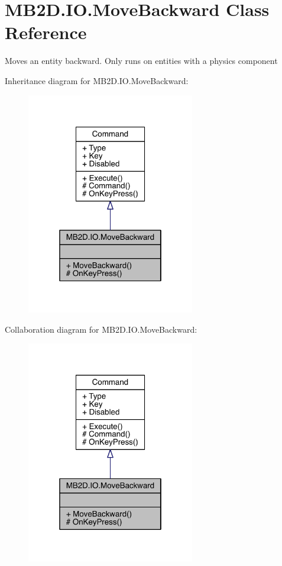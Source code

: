 \hypertarget{class_m_b2_d_1_1_i_o_1_1_move_backward}{}\section{M\+B2\+D.\+I\+O.\+Move\+Backward Class Reference}
\label{class_m_b2_d_1_1_i_o_1_1_move_backward}


Moves an entity backward. Only runs on entities with a physics component  




Inheritance diagram for M\+B2\+D.\+I\+O.\+Move\+Backward\+:
\nopagebreak
\begin{figure}[H]
\begin{center}
\leavevmode
\includegraphics[width=208pt]{class_m_b2_d_1_1_i_o_1_1_move_backward__inherit__graph}
\end{center}
\end{figure}


Collaboration diagram for M\+B2\+D.\+I\+O.\+Move\+Backward\+:
\nopagebreak
\begin{figure}[H]
\begin{center}
\leavevmode
\includegraphics[width=208pt]{class_m_b2_d_1_1_i_o_1_1_move_backward__coll__graph}
\end{center}
\end{figure}
